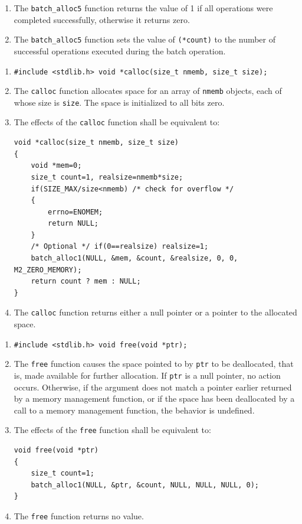 \documentclass[wd]{isov2}
\begin{document}
{\begin{enumerate}
\item The \texttt{batch\_alloc5} function returns the value of 1 if all operations were completed successfully, otherwise it returns zero.
\item The \texttt{batch\_alloc5} function sets the value of \texttt{(*count)} to the number of successful operations executed during the batch operation.
\end{enumerate}
\color{black}

\begin{enumerate}
\renewcommand{\theenumi}{\arabic{enumi}}
\item \texttt{\#include <stdlib.h>\linebreak
void *calloc(size\_t nmemb, size\_t size);}
\item The \texttt{calloc} function allocates space for an array of \texttt{nmemb} objects, each of whose size is \texttt{size}. The space is initialized to all bits zero.
\color{changed}
\item The effects of the \texttt{calloc} function shall be equivalent to:
\begin{verbatim}
void *calloc(size_t nmemb, size_t size)
{
    void *mem=0;
    size_t count=1, realsize=nmemb*size;
    if(SIZE_MAX/size<nmemb) /* check for overflow */
    {
        errno=ENOMEM;
        return NULL;
    }
    /* Optional */ if(0==realsize) realsize=1;
    batch_alloc1(NULL, &mem, &count, &realsize, 0, 0, M2_ZERO_MEMORY);
    return count ? mem : NULL;
}
\end{verbatim}
\color{black}
\item The \texttt{calloc} function returns either a null pointer or a pointer to the allocated space.
\end{enumerate}

\begin{enumerate}
\renewcommand{\theenumi}{\arabic{enumi}}
\item \texttt{\#include <stdlib.h>\linebreak
void free(void *ptr);}
\item The \texttt{free} function causes the space pointed to by \texttt{ptr} to be deallocated, that is, made available for further allocation. If \texttt{ptr} is a null pointer, no action occurs. Otherwise, if the argument does not match a pointer earlier returned by a memory management function, or if the space has been deallocated by a call to \textcolor{changed}{a memory management function}, the behavior is undefined.
\color{changed}
\item The effects of the \texttt{free} function shall be equivalent to:
\begin{verbatim}
void free(void *ptr)
{
    size_t count=1;
    batch_alloc1(NULL, &ptr, &count, NULL, NULL, NULL, 0);
}
\end{verbatim}
\color{black}
\item The \texttt{free} function returns no value.
\end{enumerate}

}
\end{document}
